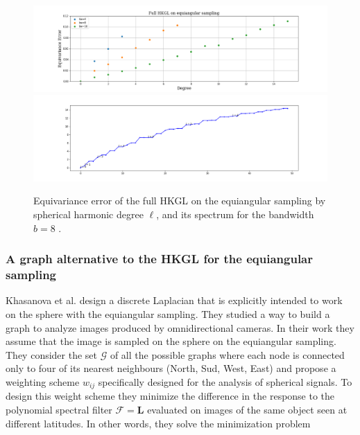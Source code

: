 \begin{figure}[h!]
	\centering
	\includegraphics[width=\textwidth]{../codes/06.Equivariance_error/FullHKGLonequiangularsampling.png}
	\includegraphics[width=\textwidth]{../codes/02.HeatKernelGraphLaplacian/equiangular/equi_full_eigenvalues_16.png}
	\caption{\label{fig:Equivariance error of the full HKGL}Equivariance error of the full HKGL on the equiangular sampling by spherical harmonic degree $\ell$, and its spectrum for the bandwidth $b=8$ .}
\end{figure}

\subsubsection{A graph alternative to the HKGL for the equiangular sampling}\label{sec:Chapter3:Frossard}

Khasanova et al. \cite{Frossard2017GraphBasedCO} design a discrete Laplacian that is explicitly intended to work on the sphere with the equiangular sampling. They studied a way to build a graph to analyze images produced by omnidirectional cameras. In their work they assume that the image is sampled on the sphere on the equiangular sampling. They consider the set $\mathcal G$ of all the possible graphs where each node is connected only to four of its nearest neighbours (North, Sud, West, East) and propose a weighting scheme $w_{ij}$ specifically designed for the analysis of spherical signals. To design this weight scheme they minimize the difference in the response to the polynomial spectral filter $\mathcal F = \mathbf L$ evaluated on images of the same object seen at different latitudes. In other words, they solve the minimization problem

